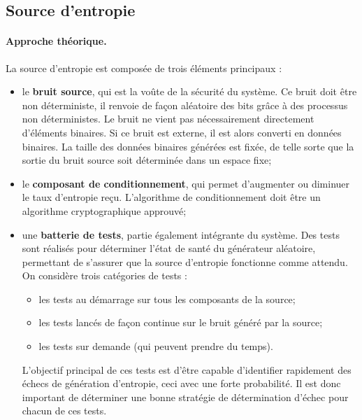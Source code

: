 \subsection{Source d'entropie}
\paragraph{Approche théorique.\\}
La source d'entropie est composée de trois éléments principaux : 
\begin{itemize}
\item le \textbf{bruit source}, qui est la voûte de la sécurité du système. Ce bruit doit être non déterministe, il renvoie de façon aléatoire des bits grâce à des processus non déterministes. Le bruit ne vient pas nécessairement directement d'éléments binaires. Si ce bruit est externe, il est alors converti en données binaires. La taille des données binaires générées est fixée, de telle sorte que la sortie du bruit source soit déterminée dans un espace fixe;
\item le \textbf{composant de conditionnement}, qui permet d'augmenter ou diminuer le taux d'entropie reçu. L'algorithme de conditionnement doit être un algorithme cryptographique approuvé;
\item une \textbf{batterie de tests}, partie également intégrante du système. Des tests sont réalisés pour déterminer l'état de santé du générateur aléatoire, permettant de s'assurer que la source d'entropie fonctionne comme attendu. On considère trois catégories de tests : 
	\begin{itemize}
	\item les tests au démarrage sur tous les composants de la source;
	\item les tests lancés de façon continue sur le bruit généré par la source;
	\item les tests sur demande (qui peuvent prendre du temps).\\
	\end{itemize}
	L'objectif principal de ces tests est d'être capable d'identifier rapidement des échecs de génération d'entropie, ceci avec une forte probabilité. Il est donc important de déterminer une bonne stratégie de détermination d'échec pour chacun de ces tests.\\
\end{itemize}


